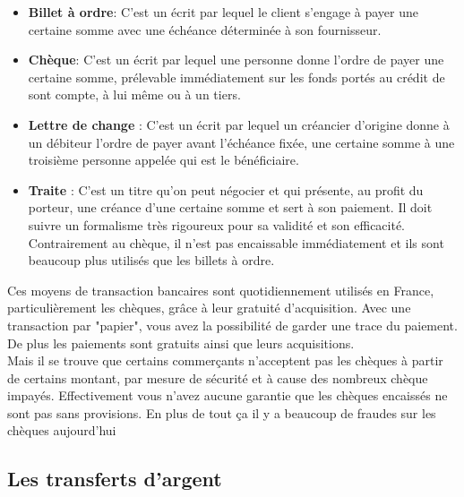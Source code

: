 \documentclass[12pt]{report}
\begin{document}
\begin{itemize}
    
    \item \textbf{Billet à ordre}: C'est un écrit par lequel le client s'engage à payer une certaine somme avec une échéance déterminée à son fournisseur.
    
    \item \textbf{Chèque}: C'est un écrit par lequel une personne donne l'ordre de payer une certaine somme, prélevable immédiatement sur les fonds portés au crédit de sont compte, à lui même ou à un tiers.
    
    \item \textbf{Lettre de change }: C'est un écrit par lequel un créancier d'origine donne à un débiteur l'ordre de payer avant l'échéance fixée, une certaine somme à une troisième personne appelée qui est le bénéficiaire.
    
    \item \textbf{Traite} : C'est un titre qu'on peut négocier et qui présente, au profit du porteur, une créance d'une certaine somme et sert à son paiement. Il doit suivre un formalisme très rigoureux pour sa validité et son efficacité. Contrairement au chèque, il n'est pas encaissable immédiatement et ils sont beaucoup plus utilisés que les billets à ordre.

\end{itemize}
    
\hspace{1cm} Ces moyens de transaction bancaires sont quotidiennement utilisés en France, particulièrement les chèques, grâce à leur gratuité d'acquisition. Avec une transaction par "papier", vous avez la possibilité de garder une trace du paiement.  De plus les paiements sont gratuits ainsi que leurs acquisitions.\\

\hspace{1cm} Mais il se trouve que certains commerçants n'acceptent pas les chèques à partir de certains montant, par mesure de sécurité et à cause  des nombreux chèque impayés. Effectivement vous n'avez aucune garantie que les chèques encaissés ne sont pas sans provisions. En plus de tout ça il y a beaucoup de fraudes sur les chèques aujourd'hui \\


    \subsection{Les transferts d'argent}
    
\end{document}
